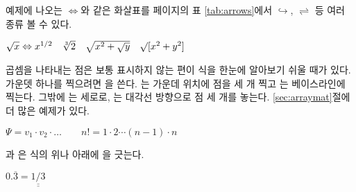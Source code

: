 \noindent 예제에 나오는 $\Leftrightarrow$와 같은 화살표를 \pageref{tab:arrows}페이지의 표 \ref{tab:arrows}에서 $\hookrightarrow$, $\rightleftharpoons$ 등 여러 종류 볼 수 있다.
\begin{example}
$\sqrt{x} \Leftrightarrow x^{1/2}
 \quad \sqrt[3]{2}
 \quad \sqrt{x^{2} + \sqrt{y}}
 \quad \surd[x^2 + y^2]$
\end{example}

곱셈을 나타내는 점은 보통 표시하지 않는 편이 식을 한눈에 알아보기 쉬울 때가 있다.
가운뎃 하나를 찍으려면 을 쓴다. 는 가운데 위치에 점을 세 개 찍고 
는 베이스라인에 찍는다.
그밖에 는 세로로, 는 대각선 방향으로 점 세 개를 놓는다. \ref{sec:arraymat}절에 더 많은 예제가 있다.
\begin{example}
$\Psi = v_1 \cdot v_2
 \cdot \ldots \qquad 
 n! = 1 \cdot 2 
 \cdots (n-1) \cdot n$
\end{example}

과 은 식의 위나 아래에 을 긋는다.
 
\begin{example}
$0.\overline{3} = 
 \underline{\underline{1/3}}$
\end{example}

